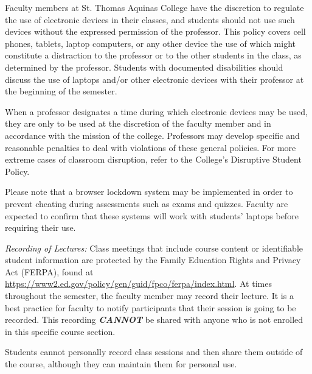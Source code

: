 \documentclass[11pt,letterpaper]{article}
\begin{document}
\newpage






Faculty members at St. Thomas Aquinas College have the discretion to regulate the use of electronic devices in their classes, and students should not use such devices without the expressed permission of the professor. This policy covers cell phones, tablets, laptop computers, or any other device the use of which might constitute a distraction to the professor or to the other students in the class, as determined by the professor. Students with documented disabilities should discuss the use of laptops and/or other electronic devices with their professor at the beginning of the semester. \pspace

When a professor designates a time during which electronic devices may be used, they are only to be used at the discretion of the faculty member and in accordance with the mission of the college. Professors may develop specific and reasonable penalties to deal with violations of these general policies. For more extreme cases of classroom disruption, refer to the College's Disruptive Student Policy. \pspace

Please note that a browser lockdown system may be implemented in order to prevent cheating during assessments such as exams and quizzes. Faculty are expected to confirm that these systems will work with students’ laptops before requiring their use. \pspace


{\itshape Recording of Lectures:} Class meetings that include course content or identifiable student information are protected by the Family Education Rights and Privacy Act (FERPA), found at \url{https://www2.ed.gov/policy/gen/guid/fpco/ferpa/index.html}. At times throughout the semester, the faculty member may record their lecture. It is a best practice for faculty to notify participants that their session is going to be recorded. This recording \textit{\textbf{CANNOT}} be shared with anyone who is not enrolled in this specific course section. \pspace

Students cannot personally record class sessions and then share them outside of the course, although they can maintain them for personal use. \pspace %



\end{document}
